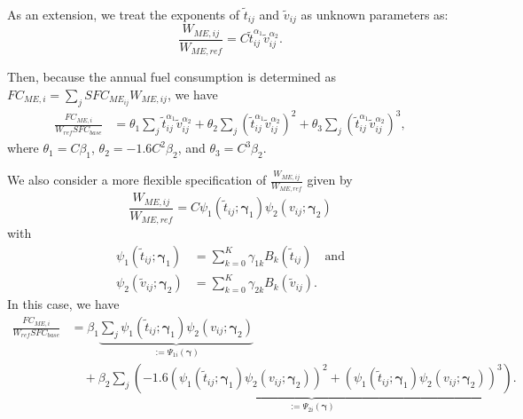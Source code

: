 \documentclass{article}
\begin{document}
As an extension, we treat the exponents of $\tilde t_{ij}$ and $\tilde v_{ij}$ as unknown parameters as:
\begin{equation}
\frac{W_{ME,{ij}} }{W_{ME,ref} }= C\tilde t_{ij}^{\alpha_1}\tilde v_{ij}^{\alpha_2}.
\end{equation}

Then, because the annual fuel consumption   is determined as $FC_{ME,i}=\sum_{j} SFC_{ME_{ij}} W_{ME,{ij}} $, we have
\begin{align}
\frac{FC_{ME,i}}{ W_{ref} SFC_{base} } &=   \theta_1  \sum_{j}\tilde t_{ij}^{\alpha_1}\tilde v_{ij}^{\alpha_2} + \theta_2  \sum_{j}   \left(\tilde t_{ij}^{\alpha_1}\tilde v_{ij}^{\alpha_2}\right)^2 +   \theta_3 \sum_{j}  \left( \tilde t_{ij}^{\alpha_1}\tilde v_{ij}^{\alpha_2} \right)^3, \label{model-2}
\end{align}
where $\theta_1=C\beta_1$, $\theta_2=-1.6 C^2\beta_2$, and $\theta_3= C^3\beta_2$.


We also consider a more flexible specification of $\frac{W_{ME,{ij}} }{W_{ME,ref} }$ given by
\[
\frac{W_{ME,{ij}} }{W_{ME,ref} }=C\psi_1( \tilde t_{ij};\boldsymbol{\gamma}_{1})\psi_2(v_{ij};\boldsymbol{\gamma}_{2})
\]
with 
\begin{align*}
\psi_1( \tilde t_{ij};\boldsymbol{\gamma}_1)&=\sum_{k=0}^{K} \gamma_{1k} B_{k}\left(\tilde t_{ij} \right)\quad\text{and}\\
\psi_2( \tilde v_{ij};\boldsymbol{\gamma}_2)&=\sum_{k=0}^{K} \gamma_{2k} B_{k}\left(\tilde v_{ij} \right).
\end{align*}
 In this case, we have 
 \begin{align}\label{model-3}
\frac{FC_{ME,i}}{ W_{ref} SFC_{base} } &=  \beta_1  \underbrace{\sum_{j}  \psi_1( \tilde t_{ij};\boldsymbol{\gamma}_{1})\psi_2(v_{ij};\boldsymbol{\gamma}_{2})}_{:=\Psi_{1i}(\boldsymbol\gamma)}\nonumber \\
&\quad+\beta_2  \underbrace{ \sum_{j}   \left(-1.6\left( \psi_1( \tilde t_{ij};\boldsymbol{\gamma}_{1})\psi_2(v_{ij};\boldsymbol{\gamma}_{2})\right)^2 +    \left(  \psi_1( \tilde t_{ij};\boldsymbol{\gamma}_{1})\psi_2(v_{ij};\boldsymbol{\gamma}_{2})\right)^3 \right)}_{:=\Psi_{2i}(\boldsymbol\gamma)}.
\end{align}
\end{document}
